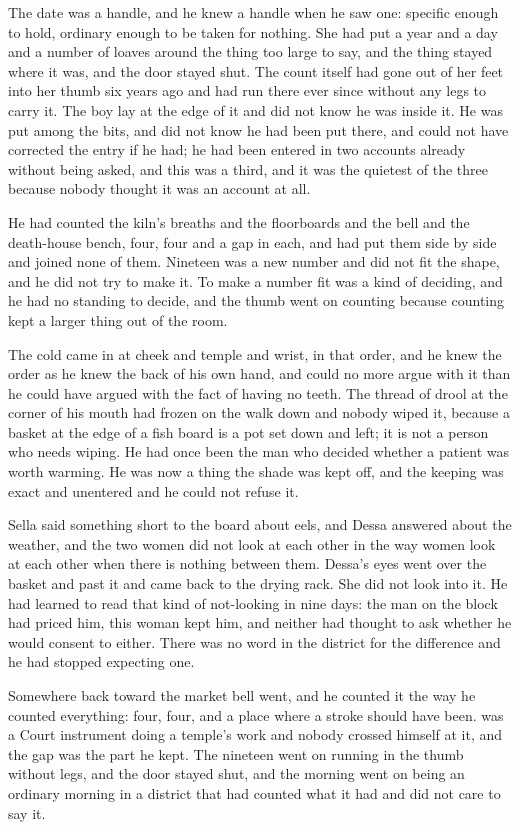 The date was a handle, and he knew a handle when he saw one: specific enough to hold, ordinary enough to be taken for nothing. She had put a year and a day and a number of loaves around the thing too large to say, and the thing stayed where it was, and the door stayed shut. The count itself had gone out of her feet into her thumb six years ago and had run there ever since without any legs to carry it. The boy lay at the edge of it and did not know he was inside it. He was put among the bits, and did not know he had been put there, and could not have corrected the entry if he had; he had been entered in two accounts already without being asked, and this was a third, and it was the quietest of the three because nobody thought it was an account at all.

He had counted the kiln's breaths and the floorboards and the bell and the death-house bench, four, four and a gap in each, and had put them side by side and joined none of them. Nineteen was a new number and did not fit the shape, and he did not try to make it. To make a number fit was a kind of deciding, and he had no standing to decide, and the thumb went on counting because counting kept a larger thing out of the room.

The cold came in at cheek and temple and wrist, in that order, and he knew the order as he knew the back of his own hand, and could no more argue with it than he could have argued with the fact of having no teeth. The thread of drool at the corner of his mouth had frozen on the walk down and nobody wiped it, because a basket at the edge of a fish board is a pot set down and left; it is not a person who needs wiping. He had once been the man who decided whether a patient was worth warming. He was now a thing the shade was kept off, and the keeping was exact and unentered and he could not refuse it.

Sella said something short to the board about eels, and Dessa answered about the weather, and the two women did not look at each other in the way women look at each other when there is nothing between them. Dessa's eyes went over the basket and past it and came back to the drying rack. She did not look into it. He had learned to read that kind of not-looking in nine days: the man on the block had priced him, this woman kept him, and neither had thought to ask whether he would consent to either. There was no word in the district for the difference and he had stopped expecting one.

Somewhere back toward  the market bell went, and he counted it the way he counted everything: four, four, and a place where a stroke should have been.  was a Court instrument doing a temple's work and nobody crossed himself at it, and the gap was the part he kept. The nineteen went on running in the thumb without legs, and the door stayed shut, and the morning went on being an ordinary morning in a district that had counted what it had and did not care to say it.

